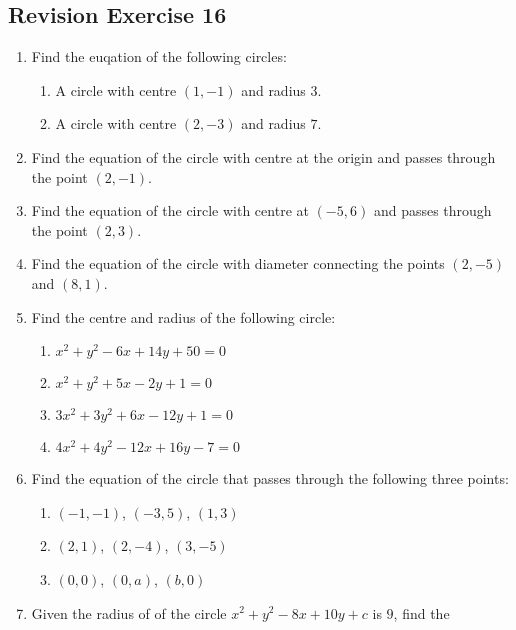\documentclass{report}
\begin{document}
\begin{multicols}{2}
      \section{Revision Exercise 16}

      \begin{enumerate}
            \item Find the euqation of the following circles:
                  \begin{enumerate}
                        \item A circle with centre $(1, -1)$ and radius $3$.
                        \item A circle with centre $(2, -3)$ and radius $7$.
                  \end{enumerate}
            \item Find the equation of the circle with centre at the origin and passes through
                  the point $(2, -1)$.
            \item Find the equation of the circle with centre at $(-5, 6)$ and passes through the
                  point $(2, 3)$.
            \item Find the equation of the circle with diameter connecting the points $(2, -5)$
                  and $(8, 1)$.
            \item Find the centre and radius of the following circle:
                  \begin{enumerate}
                        \item $x^2 + y^2 - 6x + 14y + 50 = 0$
                        \item $x^2 + y^2 + 5x - 2y + 1 = 0$
                        \item $3x^2 + 3y^2 + 6x - 12y + 1 = 0$
                        \item $4x^2 + 4y^2 - 12x + 16y - 7 = 0$
                  \end{enumerate}
            \item Find the equation of the circle that passes through the following three points:
                  \begin{enumerate}
                        \item $(-1, -1)$, $(-3, 5)$, $(1, 3)$
                        \item $(2, 1)$, $(2, -4)$, $(3, -5)$
                        \item $(0, 0)$, $(0, a)$, $(b, 0)$
                  \end{enumerate}
            \item Given the radius of of the circle $x^2 + y^2 - 8x + 10y + c$ is $9$, find the

\end{enumerate}
\end{multicols}
\end{document}
